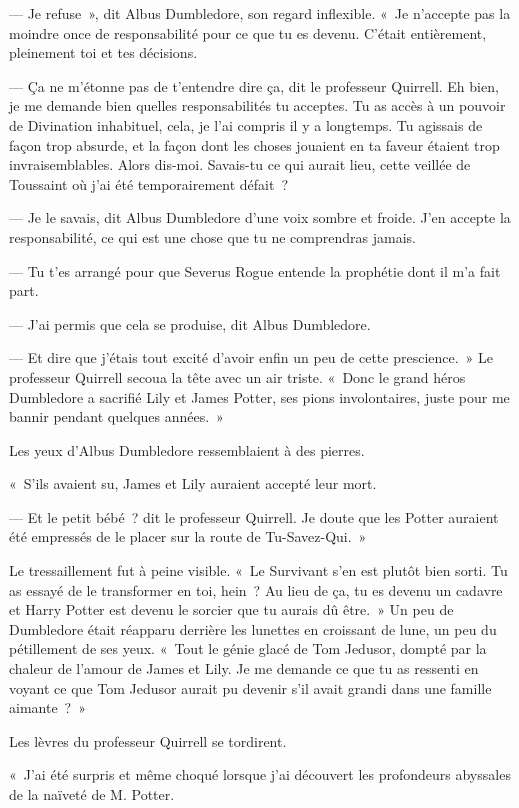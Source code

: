 --- Je refuse~», dit Albus Dumbledore, son regard inflexible. «~Je n'accepte pas la moindre once de responsabilité pour ce que tu es devenu. C'était entièrement, pleinement toi et tes décisions.

--- Ça ne m'étonne pas de t'entendre dire ça, dit le professeur Quirrell. Eh bien, je me demande bien quelles responsabilités tu acceptes. Tu as accès à un pouvoir de Divination inhabituel, cela, je l'ai compris il y a longtemps. Tu agissais de façon trop absurde, et la façon dont les choses jouaient en ta faveur étaient trop invraisemblables. Alors dis-moi. Savais-tu ce qui aurait lieu, cette veillée de Toussaint où j'ai été temporairement défait~?

--- Je le savais, dit Albus Dumbledore d'une voix sombre et froide. J'en accepte la responsabilité, ce qui est une chose que tu ne comprendras jamais.

--- Tu t'es arrangé pour que Severus Rogue entende la prophétie dont il m'a fait part.

--- J'ai permis que cela se produise, dit Albus Dumbledore.

--- Et dire que j'étais tout excité d'avoir enfin un peu de cette prescience.~» Le professeur Quirrell secoua la tête avec un air triste. «~Donc le grand héros Dumbledore a sacrifié Lily et James Potter, ses pions involontaires, juste pour me bannir pendant quelques années.~»

Les yeux d'Albus Dumbledore ressemblaient à des pierres.

«~S'ils avaient su, James et Lily auraient accepté leur mort.

--- Et le petit bébé~? dit le professeur Quirrell. Je doute que les Potter auraient été empressés de le placer sur la route de Tu-Savez-Qui.~»

Le tressaillement fut à peine visible. «~Le Survivant s'en est plutôt bien sorti. Tu as essayé de le transformer en toi, hein~? Au lieu de ça, tu es devenu un cadavre et Harry Potter est devenu le sorcier que tu aurais dû être.~» Un peu de Dumbledore était réapparu derrière les lunettes en croissant de lune, un peu du pétillement de ses yeux. «~Tout le génie glacé de Tom Jedusor, dompté par la chaleur de l'amour de James et Lily. Je me demande ce que tu as ressenti en voyant ce que Tom Jedusor aurait pu devenir s'il avait grandi dans une famille aimante~?~»

Les lèvres du professeur Quirrell se tordirent.

«~J'ai été surpris et même choqué lorsque j'ai découvert les profondeurs abyssales de la naïveté de M. Potter.

